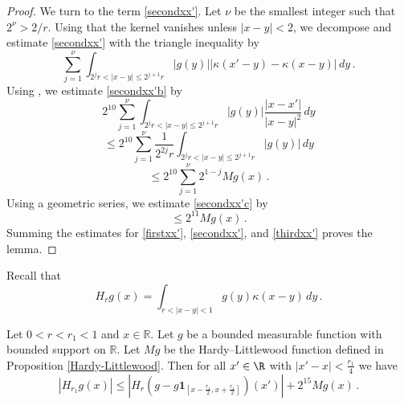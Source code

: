\begin{proof}
We turn to the term \eqref{secondxx'}.
Let $\nu$ be the smallest integer
such that $2^\nu> 2/r$.
Using that the kernel vanishes unless $|x-y|<2$, we decompose and estimate
\eqref{secondxx'}
with the triangle inequality by
\begin{equation}\label{secondxx'b}
 \sum_{j=1}^\nu \int_{2^jr<|x-y|\le 2^{j+1}r}
|g(y)| |\kappa(x'-y)-\kappa(x-y)|\, dy\,.
\end{equation}
Using , we estimate \eqref{secondxx'b}
by
\begin{equation*}
 2^{10}\sum_{j=1}^\nu \int_{2^jr<|x-y|\le 2^{j+1}r}
|g(y)| \frac{|x-x'|}{|x-y|^2}\, dy
\end{equation*}
\begin{equation*}
\le 2^{10}\sum_{j=1}^\nu \frac 1{2^{2j}r}\int_{2^jr<|x-y|\le 2^{j+1}r}
|g(y)| \, dy
\end{equation*}
\begin{equation}\label{secondxx'c}
\le 2^{10}\sum_{j=1}^\nu {2^{1-j}} Mg(x)\,.
\end{equation}
Using a geometric series, we estimate
\eqref{secondxx'c} by
\begin{equation}\label{secondxx'd}
\le 2^{11} Mg(x)\,.
\end{equation}
Summing the estimates
for \eqref{firstxx'},
\eqref{secondxx'}, and
\eqref{thirdxx'}
proves the lemma.
\end{proof}

Recall that
\begin{equation*}
    H_rg(x)=\int_{r<|x-y|<1} g(y) \kappa(x-y)\, dy\, .
\end{equation*}


\begin{lemma}
\label{Cotlar-control}
Let $0<r<r_1<1$ and $x\in \mathbb{R}$. Let $g$ be a bounded measurable function with bounded support on $\mathbb{R}$. Let $Mg$ be the Hardy--Littlewood function
defined in Proposition
\ref{Hardy-Littlewood}.
Then for all $x'\in \R$ with $|x'-x|<\frac {r_1}4$ we have
\begin{equation}\label{eq-cotlar-control}
\left|H_{r_1} g(x)
\right|\le
|H_{r}(g-g\mathbf{1}_{[x-\frac {r_1} 2,x+\frac {r_1}2]})(x')|+
2^{15}Mg(x)\, .
\end{equation}
\end{lemma}


